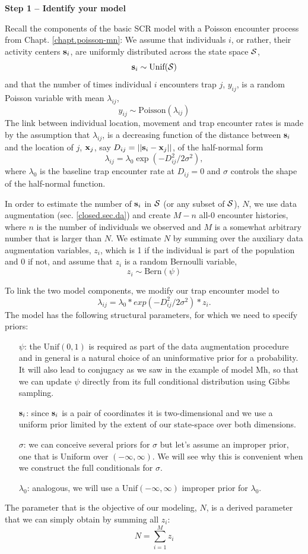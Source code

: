 {\bf Step 1 -- Identify your model}

Recall the components of the basic SCR model with a Poisson encounter process from Chapt. \ref{chapt.poisson-mn}:
We assume that individuals $i$, or rather, their activity centers
${\bf s}_i$, are uniformly distributed across the state space ${\cal S}$,
\[
{\bf s}_i  \sim \mbox{Unif}({\cal S})
\]
and that the number of times individual $i$ encounters trap $j$, $y_{ij}$, is a random Poisson variable with mean $\lambda_{ij}$,
\[
y_{ij} \sim \mbox{Poisson}(\lambda_{ij})
\]
The link between individual location, movement and trap encounter
rates is made by the assumption that $\lambda_{ij}$, is a decreasing
function of the distance between ${\bf s}_i$ and the location of $j$,
${\bf x}_{j}$, say $D_{ij} = ||{\bf s}_{i} - {\bf x}_{j}||$, of the half-normal form
\[
\lambda_{ij} =  \lambda_0  \exp(-D_{ij}^2/2\sigma^2),
\]
where $\lambda_0$ is the baseline trap encounter rate at $D_{ij}=0$ and $\sigma$ controls the shape of the half-normal function.

In order to estimate the number of ${\bf s}_i$ in ${\cal S}$ (or any
subset of ${\cal S}$), $N$, we use data augmentation (sec. \ref{closed.sec.da}) and create $M-n$ all-0 encounter histories, where $n$ is the number of individuals we observed and $M$ is a somewhat arbitrary number that is larger than $N$. We estimate $N$ by summing over the auxiliary data augmentation variables, $z_i$, which is 1 if the individual is part of the population and 0 if not, and assume that $z_i$ is a random Bernoulli variable,
\[
z_{i} \sim \mbox{Bern}(\psi)
\]

To link the two model components, we modify our trap encounter model to
\[
\lambda_{ij} = \lambda_0 * exp(-D_{ij}^2/2\sigma^2) * z_{i}.
\]
The model has the following structural parameters, for which we need to specify priors:
\begin{itemize}
\item[ $\psi$:] the $\mbox{Unif}(0,1)$ is required as part of the data augmentation procedure and in general is a natural choice of an uninformative prior for a probability. It will also lead to conjugacy as we saw in the example of model Mh, so that we can update $\psi$ directly from its full conditional distribution using Gibbs sampling.
\item[ ${\bf s}_{i}$:] since ${\bf s}_{i}$ is a pair of coordinates it is two-dimensional and we use a uniform prior limited by the extent of our state-space over both dimensions.
\item[ $\sigma$:] we can conceive several priors for $\sigma$ but let's assume an improper prior, one that is Uniform over $(-\infty, \infty)$. We will see why this is convenient when we construct the full conditionals for $\sigma$.
\item[ $\lambda_{0}$:] analogous, we will use a $\mbox{Unif}(-\infty, \infty)$ improper prior for $\lambda_{0}$.
\end{itemize}
The parameter that is the objective of our modeling, $N$, is a derived parameter that we can simply obtain by summing all $z_i$:
\[
N = \sum_{i=1}^{M} z_{i}
\]

